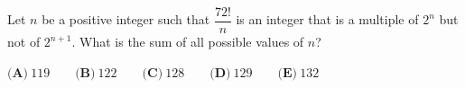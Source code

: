 Let $n$ be a positive integer such that $\dfrac{72!}n$ is an integer that is a multiple of $2^n$ but not of $2^{n+1}$. What is the sum of all possible values of $n$?

$\textbf{(A)}\ 119\qquad\textbf{(B)}\ 122\qquad\textbf{(C)}\ 128\qquad\textbf{(D)}\ 129\qquad\textbf{(E)}\ 132$
